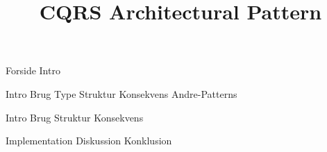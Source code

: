 \documentclass[a4paper,openany]{memoir}
\title{CQRS Architectural Pattern}
\begin{document}
	{Forside}  \newpage
	\tableofcontents\thispagestyle{fancy}  \newpage
	{Intro}  \newpage

	{Intro} \newpage
	{Brug}
	{Type}
	{Struktur}
	{Konsekvens}
	{Andre-Patterns}
	
	{Intro}
	{Brug}
	{Struktur}
	{Konsekvens}

	{Implementation}
	{Diskussion}
	{Konklusion}\newpage

	\printbibliography
	\listoffixmes
	
\end{document}
